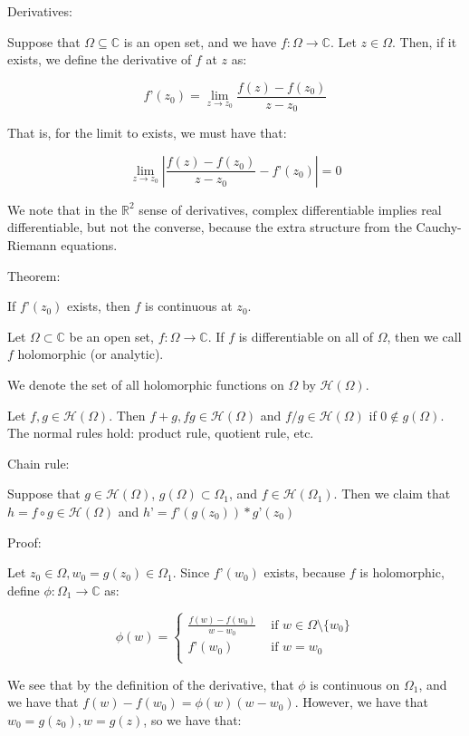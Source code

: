 \documentclass[10pt]{article}
\begin{document}
Derivatives:

Suppose that $\Omega \subseteq \mathbb{C}$ is an open set, and we have $f: \Omega \to \mathbb{C}$. Let $z \in \Omega$. Then, if it exists, we define the derivative of $f$ at $z$ as:

$$f’(z_0) = \lim_{z \to z_0} \frac{f(z) - f(z_0)}{z - z_0}$$

That is, for the limit to exists, we must have that:

$$  \lim_{z \to z_0}  \left| \frac{f(z) - f(z_0)}{z - z_0} - f’(z_0) \right|  = 0 $$

We note that in the $\mathbb{R}^2$ sense of derivatives, complex differentiable implies real differentiable, but not the converse, because the extra structure from the Cauchy-Riemann equations.

Theorem:

If $f’(z_0)$ exists, then $f$ is continuous at $z_0$.

Let $\Omega \subset \mathbb{C}$ be an open set, $f: \Omega \to \mathbb{C}$. If $f$ is differentiable on all of $\Omega$, then we call $f$ holomorphic (or analytic).

We denote the set of all holomorphic functions on $\Omega$ by $\mathcal{H}(\Omega)$.

Let $f,g \in \mathcal{H}(\Omega)$. Then $f+g, fg \in \mathcal{H}(\Omega)$ and $f/g \in \mathcal{H}(\Omega)$ if $0 \not \in g(\Omega)$. The normal rules hold: product rule, quotient rule, etc.

Chain rule:

Suppose that $g \in \mathcal{H}(\Omega)$, $g(\Omega) \subset \Omega_1$, and $f \in \mathcal{H}(\Omega_1)$. Then we claim that $h = f \circ g \in \mathcal{H}(\Omega)$ and $h’ = f’(g(z_0)) * g’(z_0)$

Proof:

Let $z_0 \in \Omega, w_0 = g(z_0) \in \Omega_1$. Since $f’(w_0)$ exists, because $f$ is holomorphic, define $\phi: \Omega_1 \to \mathbb{C}$ as:

$$ \phi(w) = \begin{cases}
\frac{f(w) - f(w_0)}{w - w_0} & \text{ if } w \in \Omega \setminus \{ w_0 \} \\ f’(w_0) & \text{ if } w = w_0 \\ \end{cases}$$

We see that by the definition of the derivative, that $\phi$ is continuous on $\Omega_1$, and we have that $f(w) - f(w_0) = \phi(w) (w - w_0)$. However, we have that $w_0 = g(z_0), w = g(z)$, so we have that:
\end{document}
